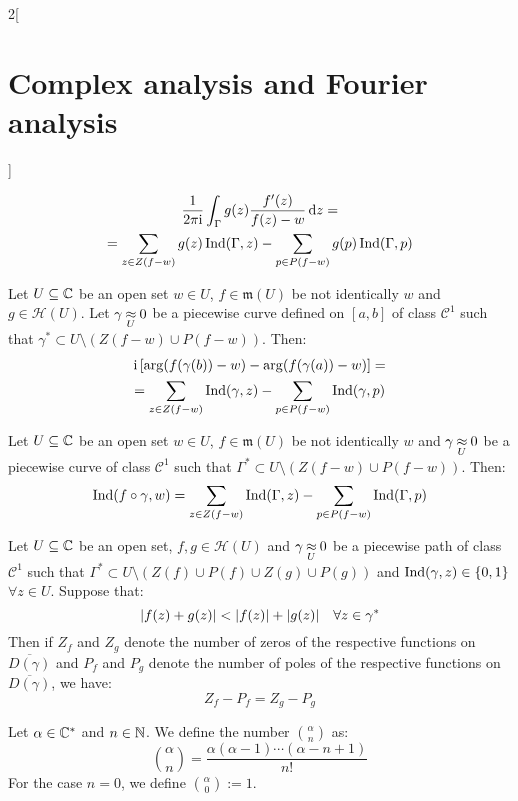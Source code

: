 \documentclass[../../../main.tex]{subfiles}
\begin{document}
\begin{multicols}{2}[\section{Complex analysis and Fourier analysis}]
\begin{theorem}
\begin{multline*}
      \frac{1}{2\pi\mathrm{i}}\int_{\Gamma}g(z)\frac{f'(z)}{f(z)-w}\dd{z}=\\=\sum_{z\in Z(f-w)}g(z)\operatorname{Ind}(\Gamma,z)-\sum_{p\in P(f-w)}g(p)\operatorname{Ind}(\Gamma,p)
    \end{multline*}
  \end{theorem}
  \begin{corollary}
    Let $U\subseteq \mathbb{C}$ be an open set $w\in U$, $f\in\mathfrak{m}(U)$ be not identically $w$ and $g\in\mathcal{H}(U)$. Let $\gamma\mathbin{\underset{U}{\approx}} 0$ be a piecewise curve defined on $[a,b]$ of class $\mathcal{C}^1$ such that $\gamma^*\subset U\setminus (Z(f-w)\cup P(f-w))$. Then:
    \begin{multline*}
      \mathrm{i}\left[\arg(f(\gamma(b))-w)-\arg(f(\gamma(a))-w)\right]=\\=\sum_{z\in Z(f-w)}\operatorname{Ind}(\gamma,z)-\sum_{p\in P(f-w)}\operatorname{Ind}(\gamma,p)
    \end{multline*}
  \end{corollary}
  \begin{corollary}
    Let $U\subseteq \mathbb{C}$ be an open set $w\in U$, $f\in\mathfrak{m}(U)$ be not identically $w$ and $\gamma\mathbin{\underset{U}{\approx}} 0$ be a piecewise curve of class $\mathcal{C}^1$ such that $\Gamma^*\subset U\setminus (Z(f-w)\cup P(f-w))$. Then:
    \begin{equation*}
      \operatorname{Ind}(f\circ\gamma,w)=\sum_{z\in Z(f-w)}\operatorname{Ind}(\Gamma,z)-\sum_{p\in P(f-w)}\operatorname{Ind}(\Gamma,p)
    \end{equation*}
  \end{corollary}
  \begin{theorem}
    Let $U\subseteq \mathbb{C}$ be an open set, $f,g\in\mathcal{H}(U)$ and $\gamma\mathbin{\underset{U}{\approx}} 0$ be a piecewise path of class $\mathcal{C}^1$ such that $\Gamma^*\subset U\setminus (Z(f)\cup P(f)\cup Z(g)\cup P(g))$ and $\operatorname{Ind}(\gamma,z)\in\{0,1\}$ $\forall z\in U$. Suppose that: $$\abs{f(z)+g(z)}<\abs{f(z)}+\abs{g(z)}\quad\forall z\in \gamma^*$$ Then if $Z_f$ and $Z_g$ denote the number of zeros of the respective functions on $\overline{D(\gamma)}$ and $P_f$ and $P_g$ denote the number of poles of the respective functions on $\overline{D(\gamma)}$, we have: $$Z_f-P_f=Z_g-P_g$$
  \end{theorem}
  \begin{definition}
    Let $\alpha\in\mathbb{C}^*$ and $n\in\mathbb{N}$. We define the number $\binom{\alpha}{n}$ as: $$\binom{\alpha}{n}=\frac{\alpha(\alpha-1)\cdots(\alpha-n+1)}{n!}$$ For the case $n=0$, we define $\binom{\alpha}{0}:=1$.
  \end{definition}
  \begin{proposition}

\end{proposition}
\end{multicols}
\end{document}
